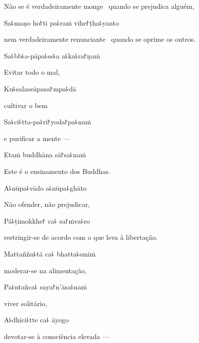\begin{english}
  Não se é verdadeiramente monge \pause\ quando se prejudica alguém,
\end{english}

Sa꜕maṇo ho꜓ti pa꜕raṁ vihe꜓ṭha꜕yanto

\begin{english}
  nem verdadeiramente renunciante \pause\ quando se oprime os outros.
\end{english}

Sa꜕bb꜕a-pāpa꜕ss꜕a a꜕ka꜕ra꜓ṇaṁ

\begin{english}
  Evitar todo o mal,
\end{english}

Ku꜕salassūpasa꜓mpa꜕dā

\begin{english}
  cultivar o bem
\end{english}

Sa꜕ci꜕tta-pa꜕ri꜓yoda꜓pa꜕naṁ

\begin{english}
  e purificar a mente ---
\end{english}

Etaṁ buddhāna sā꜓sa꜕naṁ

\begin{english}
  Este é o ensinamento dos Buddhas.
\end{english}

A꜕nūpa꜕vādo a꜕nūpa꜕ghāto

\begin{english}
  Não ofender, não prejudicar,
\end{english}

Pā꜕ṭimokkhe꜓ ca꜕ sa꜓ṁva꜕ro

\begin{english}
  restringir-se de acordo com o que leva à libertação.
\end{english}

Mattaññu꜕tā ca꜕ bhatta꜕smiṁ

\begin{english}
  moderar-se na alimentação,
\end{english}

Pa꜕ntañca꜕ saya꜓n'āsa꜕naṁ

\begin{english}
  viver solitário,
\end{english}

A꜕dhici꜕tte ca꜕ āyogo

\begin{english}
  devotar-se à consciência elevada ---
\end{english}

